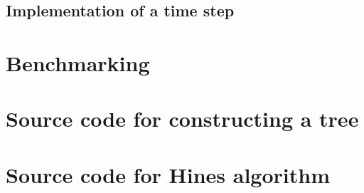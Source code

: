 \documentclass[11pt,a4paper]{article}
\begin{document}
\subsection{Implementation of a time step}

\section{Benchmarking}


\newpage
\appendix
\newpage
\section{Source code for constructing a tree}

\newpage
\section{Source code for Hines algorithm}
\label{appendix:hinessource}

\end{document}
